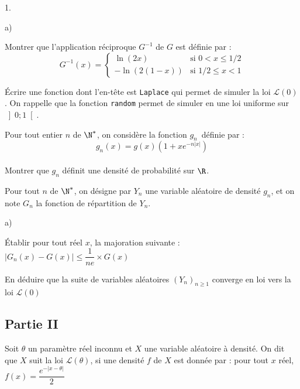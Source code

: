 \documentclass[11pt]{article}%
\begin{document}
\begin{noliste}{1.}
\item 
\begin{noliste}{a)}
 \setlength{\itemsep}{2mm}
\item Montrer que l'application réciproque $G^{-1}$ de $G$ est définie
par :
\[
G^{-1}\left( x\right) = \left\{ 
\begin{array}{cc}
\ln \left( 2x\right) & \text{si }0<x\leq 1/2 \\
-\ln \left( 2\left( 1-x\right) \right) & \text{si }1/2\leq x<1
\end{array}
\right.
\]

\item Écrire une fonction \Scilab{} dont l'en-tête est \texttt{Laplace}
qui permet de simuler la loi $\mathcal{L}\left( 0\right) $. On rappelle
que
la fonction \texttt{random} permet de simuler en \Scilab{} une loi
uniforme sur 
$\left] 0;1\right[ $.
\end{noliste}

\item Pour tout entier $n$ de $\N^{\ast }$, on considère la
fonction $g_{n}$\ définie par :
\[
g_{n}\left( x\right) = g\left( x\right) \left( 1 + xe^{-n\left|
x\right| }\right)
\]
\\
Montrer que $g_{n}$ définit une densité de probabilité sur $\R$.

\hspace{-1cm}Pour tout $n$ de $\N^{\ast }$, on désigne par $Y_{n} $ une
variable aléatoire de densité $g_{n}$, et on note $G_{n}$
la fonction de répartition de $Y_{n}$.

\item 
\begin{noliste}{a)}
 \setlength{\itemsep}{2mm}
\item Établir pour tout réel $x$, la majoration suivante : $\left|
G_{n}\left( x\right) -G\left( x\right) \right| \leq \dfrac{1}{ne}\times
G\left( x\right) $

\item En déduire que la suite de variables aléatoires $\left(
Y_{n}\right)_{n\geq 1}$ converge en loi vers la loi $\mathcal{L}\left(
0\right) $
\end{noliste}
\end{noliste}

\subsection*{Partie II}

Soit $\theta $ un paramètre réel inconnu et $X$ une variable aléatoire
à densité. On dit que $X$ suit la loi $\mathcal{L}\left(
\theta \right) $, si une densité $f$ de $X$ est donnée par : pour
tout $x$ réel, $f\left( x\right) = \dfrac{e^{-\left| x-\theta
\right| }}{2}$
\end{document}
